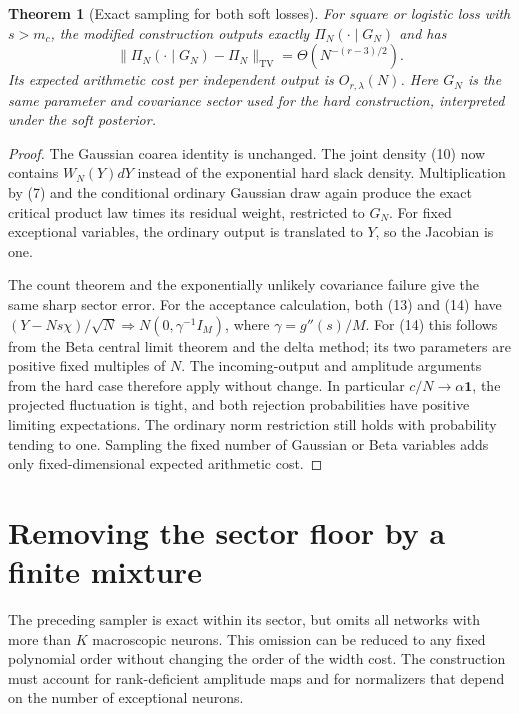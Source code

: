 \documentclass[11pt]{article}
\newtheorem{theorem}{Theorem}\newtheorem{lemma}[theorem]{Lemma}
\newcommand{\TV}{\mathrm{TV}}\newcommand{\one}{\mathbf1}
\begin{document}
\begin{theorem}[Exact sampling for both soft losses]
For square or logistic loss with $s>m_c$, the modified construction
outputs exactly $\Pi_N(\cdot\mid G_N)$ and has
\[
 \|\Pi_N(\cdot\mid G_N)-\Pi_N\|_{\TV}
             =\Theta(N^{-(r-3)/2}).                       \tag{15}
\]
Its expected arithmetic cost per independent output is
$O_{r,\lambda}(N)$. Here $G_N$ is the same parameter and covariance
sector used for the hard construction, interpreted under the soft
posterior.
\end{theorem}
\begin{proof}
The Gaussian coarea identity is unchanged. The joint density (10) now
contains $W_N(Y)dY$ instead of the exponential hard slack density.
Multiplication by (7) and the conditional ordinary Gaussian draw again
produce the exact critical product law times its residual weight,
restricted to $G_N$. For fixed exceptional variables, the ordinary
output is translated to $Y$, so the Jacobian is one.

The count theorem and the exponentially unlikely covariance failure
give the same sharp sector error. For the acceptance calculation,
both (13) and (14) have
$(Y-Ns\chi)/\sqrt N\Rightarrow N(0,\gamma^{-1}I_M)$,
where $\gamma=g''(s)/M$. For (14) this follows from the Beta central
limit theorem and the delta method; its two parameters are positive
fixed multiples of $N$. The incoming-output and amplitude arguments
from the hard case therefore apply without change. In particular
$c/N\to\alpha\mathbf1$, the projected fluctuation is tight, and both
rejection probabilities have positive limiting expectations. The
ordinary norm restriction still holds with probability tending to one.
Sampling the fixed number of Gaussian or Beta variables adds only
fixed-dimensional expected arithmetic cost.
\end{proof}

\section{Removing the sector floor by a finite mixture}\label{sec:multisector}
The preceding sampler is exact within its sector, but omits all networks
with more than $K$ macroscopic neurons. This omission can be reduced to
any fixed polynomial order without changing the order of the width cost.
The construction must account for rank-deficient amplitude maps and for
normalizers that depend on the number of exceptional neurons.
\end{document}
